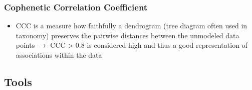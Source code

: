 \documentclass[12pt,a4paper]{article}
\begin{document}
\subsubsection{Cophenetic Correlation Coefficient} %
\label{ssub:cophenetic_correlation_coefficient}
\begin{itemize}
  \item CCC is a measure how faithfully a dendrogram (tree diagram often used in taxonomy) preserves the pairwise distances between the unmodeled data points
  \newline \indent $\longrightarrow$ CCC > 0.8 is considered high and thus a good representation of associations within the data
\end{itemize}



\subsection{Tools} %
\label{sub:tools}
\end{document}
